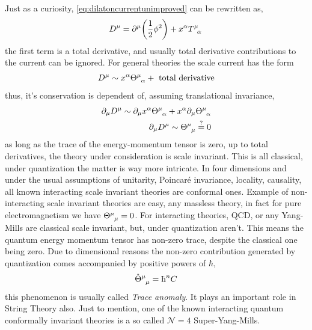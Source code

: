 Just as a curiosity, \cref{eq:dilatoncurrentunimproved} can be rewritten as,
\begin{align}
    D^\mu = \partial^\mu\qty(\frac12 \phi^2)+x^\alpha \tensor{T}{^\mu_\alpha}
\end{align}
the first term is a total derivative, and usually total derivative contributions to the current can be ignored. 
For general theories the scale current has the form
\begin{align}
    D^\mu \sim x^\alpha \tensor{\Theta}{^\mu_\alpha} +\textnormal{ total derivative}
\end{align}
thus, it's conservation is dependent of, assuming translational invariance,
\begin{align}
    \partial_\mu D^\mu \sim \partial _\mu x^\alpha \tensor{\Theta}{^\mu_\alpha}+x^\alpha \partial_\mu\tensor{\Theta}{^\mu_\alpha}\\
    \partial_\mu D^\mu \sim  \tensor{\Theta}{^\mu_\mu}\stackrel{?}{=}0
\end{align}
as long as the trace of the energy-momentum tensor is zero, up to total derivatives, the theory under consideration is 
scale invariant. This is all classical, under quantization the matter is way more intricate. In four dimensions and under the usual assumptions 
of unitarity, Poincaré invariance, locality, causality, all known interacting scale invariant theories are conformal ones. Example of 
non-interacting scale invariant theories are easy, any massless theory, in fact for pure electromagnetism we have $\tensor{\Theta}{^\mu_\mu}=0$. 
For interacting theories, QCD, or any Yang-Mills are classical scale invariant, but, under quantization aren't. This means the 
quantum energy momentum tensor has non-zero trace, despite the classical one being zero. Due to dimensional reasons the non-zero 
contribution generated by quantization comes accompanied by positive powers of $\hbar$,
\begin{align}
    \tensor{{\hat {\Theta}}}{^\mu_\mu}=\hbar^n C
\end{align}
this phenomenon is usually called \textit{Trace anomaly}. It plays an important role in String Theory also. Just to mention, 
one of the known interacting quantum conformally invariant theories is a so called $\mathcal N=4$ Super-Yang-Mills.